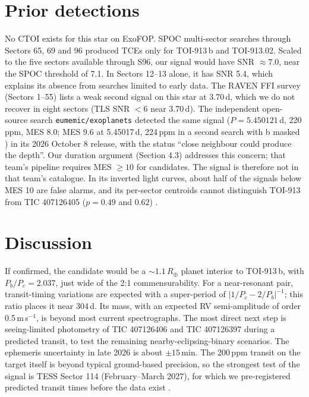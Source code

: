 \documentclass[11pt]{article}
\begin{document}
\section{Prior detections}
No CTOI exists for this star on ExoFOP. SPOC multi-sector searches through Sectors 65, 69 and 96 produced TCEs only for TOI-913\,b and TOI-913.02. Scaled to the five sectors available through S96, our signal would have SNR $\approx7.0$, near the SPOC threshold of 7.1. In Sectors 12--13 alone, it has SNR 5.4, which explains its absence from searches limited to early data. The RAVEN FFI survey \cite{raven} (Sectors 1--55) lists a weak second signal on this star at 3.70\,d, which we do not recover in eight sectors (TLS SNR $<6$ near 3.70\,d). The independent open-source search \texttt{eumemic/exoplanets} \cite{eumemic} detected the same signal ($P=5.450121$\,d, 220\,ppm, MES 8.0; MES 9.6 at 5.45017\,d, 224\,ppm in a second search with b masked \cite{eumemicissue}) in its 2026 October 8 release, with the status ``close neighbour could produce the depth''. Our duration argument (Section 4.3) addresses this concern; that team's pipeline requires MES $\geq10$ for candidates. The signal is therefore not in that team's catalogue. In its inverted light curves, about half of the signals below MES 10 are false alarms, and its per-sector centroids cannot distinguish TOI-913 from TIC 407126405 ($p=0.49$ and $0.62$) \cite{eumemicissue}.

\section{Discussion}
If confirmed, the candidate would be a $\sim1.1\,R_\oplus$ planet interior to TOI-913\,b, with $P_b/P_c = 2.037$, just wide of the 2:1 commensurability. For a near-resonant pair, transit-timing variations are expected with a super-period of $|1/P_c - 2/P_b|^{-1}$; this ratio places it near 304\,d. Its mass, with an expected RV semi-amplitude of order 0.5\,m\,s$^{-1}$, is beyond most current spectrographs. The most direct next step is seeing-limited photometry of TIC 407126406 and TIC 407126397 during a predicted transit, to test the remaining nearby-eclipsing-binary scenarios. The ephemeris uncertainty in late 2026 is about $\pm15$\,min. The 200\,ppm transit on the target itself is beyond typical ground-based precision, so the strongest test of the signal is TESS Sector 114 (February--March 2027), for which we pre-registered predicted transit times before the data exist \cite{prereg}.
\end{document}
